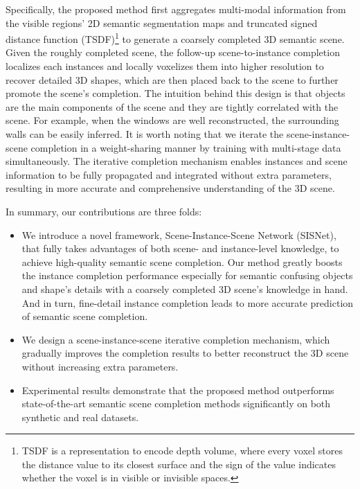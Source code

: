 \documentclass[final]{cvpr}
\begin{document}
Specifically, the proposed method first aggregates multi-modal information from the visible regions' 2D semantic segmentation maps and truncated signed distance function (TSDF)\footnote{TSDF is a representation to encode depth volume, where every voxel stores the distance value  to its closest surface and the sign of the value indicates whether the voxel is in visible or invisible spaces.} to generate a coarsely completed 3D semantic scene. Given the roughly completed scene, the follow-up scene-to-instance completion localizes each instances and locally voxelizes them into higher resolution to recover detailed 3D shapes, which are then placed back to the scene to further promote the scene's completion. 
The intuition behind this design is that objects are the main components of the scene and they are tightly correlated with the scene. For example, when the windows are well reconstructed, the surrounding walls can be easily inferred. {It is worth noting that we iterate the scene-instance-scene completion in a weight-sharing manner by training with multi-stage data simultaneously.} The iterative completion mechanism enables instances and scene information to be fully propagated and integrated without extra parameters, resulting in more accurate and comprehensive understanding of the 3D scene.

In summary, our contributions are three folds:
\begin{itemize}
    \vspace{-0.25cm}
    \item We introduce a novel framework, Scene-Instance-Scene Network (SISNet), that fully takes advantages of both scene- and instance-level knowledge, to achieve high-quality semantic scene completion. Our method greatly boosts the instance completion performance especially for semantic confusing objects and shape's details with a coarsely completed 3D scene's knowledge in hand. And in turn, fine-detail instance completion leads to more accurate prediction of semantic scene completion.
    \vspace{-0.25cm}
    \item We design a scene-instance-scene iterative completion mechanism, which gradually improves the completion results to better reconstruct the 3D scene without increasing extra parameters.
    \vspace{-0.25cm}
    \item Experimental results demonstrate that the proposed method outperforms state-of-the-art semantic scene completion methods significantly on both synthetic and real datasets.
\end{itemize}
\vspace{-0.2cm}
\end{document}

